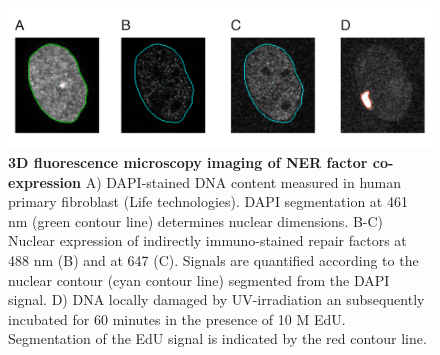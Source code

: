 \begin{figure}[htbp]
	\begin{center}
		\includegraphics[width=1\textwidth]{Abbildungen/figure4_1.pdf}
		\caption{\textbf{3D fluorescence microscopy imaging of NER factor co-expression} A) DAPI-stained DNA content measured in human primary fibroblast (Life technologies). DAPI segmentation at 461 nm  (green contour line) determines nuclear dimensions. B-C) Nuclear expression of indirectly immuno-stained repair factors at 488 nm (B) and at 647 (C). Signals are quantified according to the nuclear contour (cyan contour line) segmented from the DAPI signal. D) DNA locally damaged by UV-irradiation an subsequently incubated for 60 minutes in the presence of 10 \textmu M EdU. Segmentation of the EdU signal is indicated by the red contour line.   }
		\label{fig:coStaining}
	\end{center}
\end{figure}


